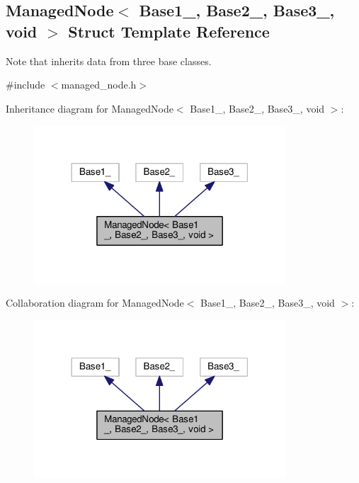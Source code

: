 \hypertarget{structManagedNode_3_01Base1___00_01Base2___00_01Base3___00_01void_01_4}{}\subsection{Managed\+Node$<$ Base1\+\_\+, Base2\+\_\+, Base3\+\_\+, void $>$ Struct Template Reference}
\label{structManagedNode_3_01Base1___00_01Base2___00_01Base3___00_01void_01_4}


Note that inherits data from three base classes.  




{\ttfamily \#include $<$managed\+\_\+node.\+h$>$}



Inheritance diagram for Managed\+Node$<$ Base1\+\_\+, Base2\+\_\+, Base3\+\_\+, void $>$\+:\nopagebreak
\begin{figure}[H]
\begin{center}
\leavevmode
\includegraphics[width=266pt]{structManagedNode_3_01Base1___00_01Base2___00_01Base3___00_01void_01_4__inherit__graph}
\end{center}
\end{figure}


Collaboration diagram for Managed\+Node$<$ Base1\+\_\+, Base2\+\_\+, Base3\+\_\+, void $>$\+:\nopagebreak
\begin{figure}[H]
\begin{center}
\leavevmode
\includegraphics[width=266pt]{structManagedNode_3_01Base1___00_01Base2___00_01Base3___00_01void_01_4__coll__graph}
\end{center}
\end{figure}
